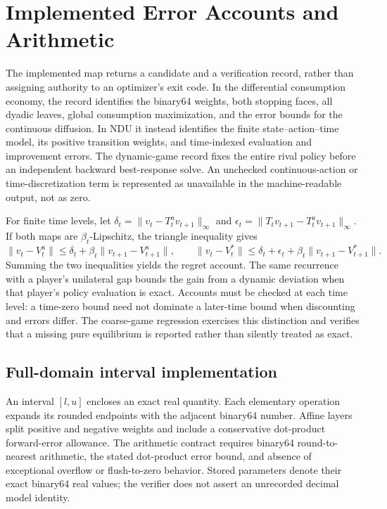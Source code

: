 \section{Implemented Error Accounts and Arithmetic}
The implemented map returns a candidate and a verification record, rather than assigning authority to an optimizer's exit code. In the differential consumption economy, the record identifies the binary64 weights, both stopping faces, all dyadic leaves, global consumption maximization, and the error bounds for the continuous diffusion. In NDU it instead identifies the finite state--action--time model, its positive transition weights, and time-indexed evaluation and improvement errors. The dynamic-game record fixes the entire rival policy before an independent backward best-response solve. An unchecked continuous-action or time-discretization term is represented as unavailable in the machine-readable output, not as zero.

For finite time levels, let $\delta_t=\|v_t-T_t^av_{t+1}\|_\infty$ and $\epsilon_t=\|T_tv_{t+1}-T_t^av_{t+1}\|_\infty$. If both maps are $\beta_t$-Lipschitz, the triangle inequality gives
\[
 \|v_t-V_t^a\|\leq\delta_t+\beta_t\|v_{t+1}-V_{t+1}^a\|,
 \qquad
 \|v_t-V_t^*\|\leq\delta_t+\epsilon_t+\beta_t\|v_{t+1}-V_{t+1}^*\|.
\]
Summing the two inequalities yields the regret account. The same recurrence with a player's unilateral gap bounds the gain from a dynamic deviation when that player's policy evaluation is exact. Accounts must be checked at each time level: a time-zero bound need not dominate a later-time bound when discounting and errors differ. The coarse-game regression exercises this distinction and verifies that a missing pure equilibrium is reported rather than silently treated as exact.

\subsection{Full-domain interval implementation}
An interval $[l,u]$ encloses an exact real quantity. Each elementary operation expands its rounded endpoints with the adjacent binary64 number. Affine layers split positive and negative weights and include a conservative dot-product forward-error allowance. The arithmetic contract requires binary64 round-to-nearest arithmetic, the stated dot-product error bound, and absence of exceptional overflow or flush-to-zero behavior. Stored parameters denote their exact binary64 real values; the verifier does not assert an unrecorded decimal model identity.

